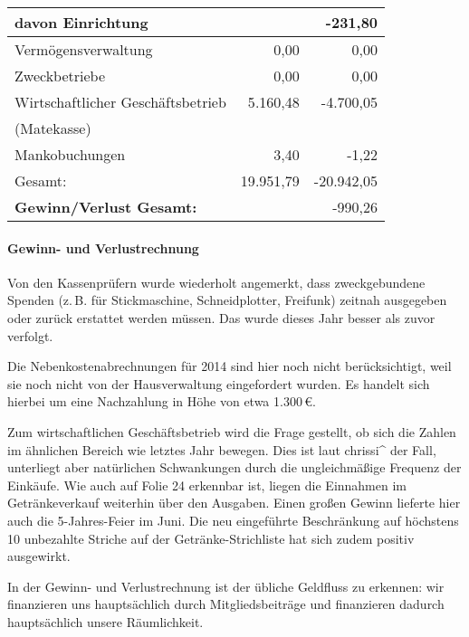 \documentclass[parskip=half-]{s0minutes}
\begin{document}
\begin{longtable}{|l|r|r|}
	\quad davon Einrichtung           &               &      -231{,}80 \\
  \hline
  Vermögensverwaltung               &        0{,}00 &         0{,}00 \\
  \hline
  Zweckbetriebe                     &        0{,}00 &         0{,}00 \\
  \hline
  Wirtschaftlicher Geschäftsbetrieb &  5{.}160{,}48 &  -4{.}700{,}05 \\
  \quad (Matekasse) && \\
  \hline
  Mankobuchungen                    &        3{,}40 &        -1{,}22 \\
  \hline
  Gesamt:                           & 19{.}951{,}79 & -20{.}942{,}05 \\
  \hline\hline
	\textbf{Gewinn/Verlust Gesamt:}   &               &      -990{,}26 \\
  \hline
\end{longtable}

\paragraph{Gewinn- und Verlustrechnung} Von den Kassenprüfern wurde wiederholt
angemerkt, dass zweckgebundene Spenden (z.\,B. für Stickmaschine,
Schneidplotter, Freifunk) zeitnah ausgegeben oder zurück erstattet werden
müssen. Das wurde dieses Jahr besser als zuvor verfolgt.

Die Nebenkostenabrechnungen für 2014 sind hier noch nicht berücksichtigt, weil
sie noch nicht von der Hausverwaltung eingefordert wurden. Es handelt sich
hierbei um eine Nachzahlung in Höhe von etwa 1{.}300\,€.

Zum wirtschaftlichen Geschäftsbetrieb wird die Frage gestellt, ob sich die
Zahlen im ähnlichen Bereich wie letztes Jahr bewegen. Dies ist laut chrissi\^{}
der Fall, unterliegt aber natürlichen Schwankungen durch die ungleichmäßige
Frequenz der Einkäufe. Wie auch auf Folie 24 erkennbar ist, liegen die Einnahmen
im Getränkeverkauf weiterhin über den Ausgaben. Einen großen Gewinn lieferte
hier auch die 5-Jahres-Feier im Juni. Die neu eingeführte Beschränkung auf
höchstens 10 unbezahlte Striche auf der Getränke-Strichliste hat sich zudem
positiv ausgewirkt.

In der Gewinn- und Verlustrechnung ist der übliche Geldfluss zu erkennen: wir
finanzieren uns hauptsächlich durch Mitgliedsbeiträge und finanzieren dadurch
hauptsächlich unsere Räumlichkeit.
\end{document}

